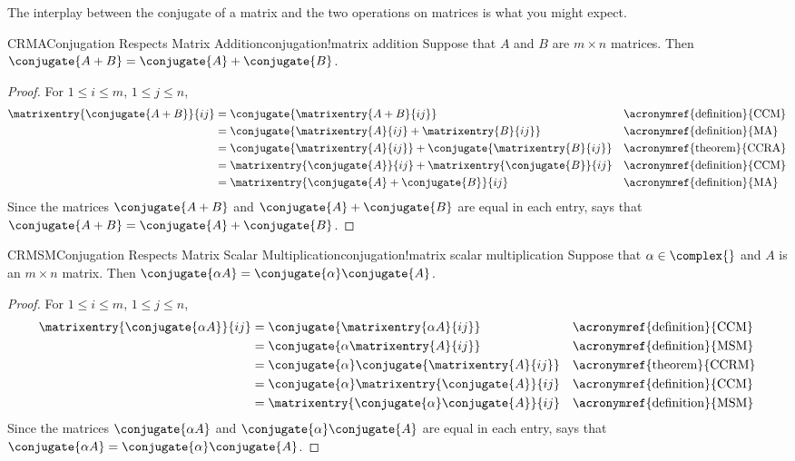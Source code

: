 %
The interplay between the conjugate of a matrix and the two operations on matrices is what you might expect.
%
\begin{theorem}{CRMA}{Conjugation Respects Matrix Addition}{conjugation!matrix addition}
Suppose that $A$ and $B$ are $m\times n$ matrices.  Then $\conjugate{A+B}=\conjugate{A}+\conjugate{B}$.
\end{theorem}
%
\begin{proof}
%
For $1\leq i\leq m$, $1\leq j\leq n$,
%
\begin{align*}
%
\matrixentry{\conjugate{A+B}}{ij}
&=\conjugate{\matrixentry{A+B}{ij}}&&\text{\acronymref{definition}{CCM}}\\
&=\conjugate{\matrixentry{A}{ij}+\matrixentry{B}{ij}}&&\text{\acronymref{definition}{MA}}\\
&=\conjugate{\matrixentry{A}{ij}}+\conjugate{\matrixentry{B}{ij}}&&\text{\acronymref{theorem}{CCRA}}\\
&=\matrixentry{\conjugate{A}}{ij}+\matrixentry{\conjugate{B}}{ij}&&\text{\acronymref{definition}{CCM}}\\
&=\matrixentry{\conjugate{A}+\conjugate{B}}{ij}&&\text{\acronymref{definition}{MA}}
%
\end{align*}
%
Since the matrices  $\conjugate{A+B}$ and $\conjugate{A}+\conjugate{B}$  are equal in each entry,  says that $\conjugate{A+B}=\conjugate{A}+\conjugate{B}$.
%
\end{proof}
%
\begin{theorem}{CRMSM}{Conjugation Respects Matrix Scalar Multiplication}{conjugation!matrix scalar multiplication}
Suppose that $\alpha\in\complex{\null}$ and $A$ is an $m\times n$ matrix.  Then $\conjugate{\alpha A}=\conjugate{\alpha}\conjugate{A}$.
\end{theorem}
%
\begin{proof}
%
For $1\leq i\leq m$, $1\leq j\leq n$,
%
\begin{align*}
%
\matrixentry{\conjugate{\alpha A}}{ij}
&=\conjugate{\matrixentry{\alpha A}{ij}}&&\text{\acronymref{definition}{CCM}}\\
&=\conjugate{\alpha\matrixentry{A}{ij}}&&\text{\acronymref{definition}{MSM}}\\
&=\conjugate{\alpha}\conjugate{\matrixentry{A}{ij}}&&\text{\acronymref{theorem}{CCRM}}\\
&=\conjugate{\alpha}\matrixentry{\conjugate{A}}{ij}&&\text{\acronymref{definition}{CCM}}\\
&=\matrixentry{\conjugate{\alpha}\conjugate{A}}{ij}&&\text{\acronymref{definition}{MSM}}
%
\end{align*}
%
Since the matrices  $\conjugate{\alpha A}$ and $\conjugate{\alpha}\conjugate{A}$  are equal in each entry,  says that $\conjugate{\alpha A}=\conjugate{\alpha}\conjugate{A}$.
%
\end{proof}
